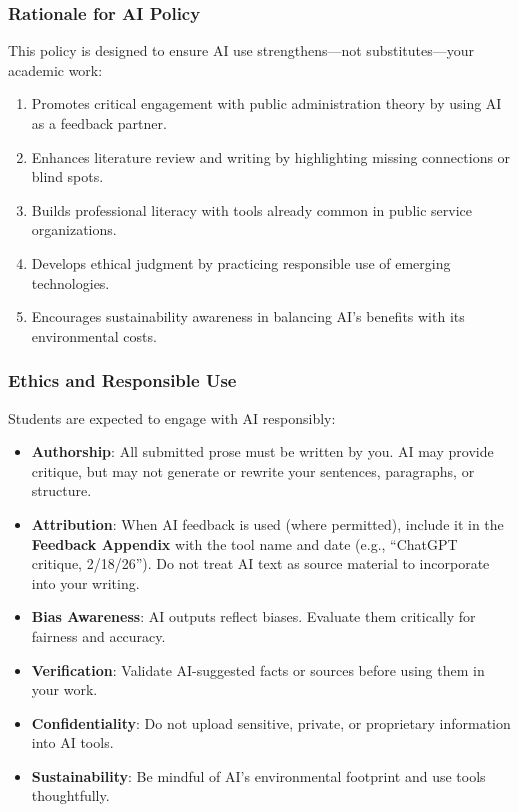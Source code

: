 \documentclass[11pt]{article}     %
\begin{document}
\subsubsection*{Rationale for AI Policy}

This policy is designed to ensure AI use strengthens---not substitutes---your academic work:

\begin{enumerate}
    \item Promotes critical engagement with public administration theory by using AI as a feedback partner.
    \item Enhances literature review and writing by highlighting missing connections or blind spots.
    \item Builds professional literacy with tools already common in public service organizations.
    \item Develops ethical judgment by practicing responsible use of emerging technologies.
    \item Encourages sustainability awareness in balancing AI's benefits with its environmental costs.
\end{enumerate}

\subsubsection*{Ethics and Responsible Use}

\noindent Students are expected to engage with AI responsibly:

\begin{itemize}
    \item \textbf{Authorship}: All submitted prose must be written by you. AI may provide critique, but may not generate or rewrite your sentences, paragraphs, or structure.
    \item \textbf{Attribution}: When AI feedback is used (where permitted), include it in the \textbf{Feedback Appendix} with the tool name and date (e.g., ``ChatGPT critique, 2/18/26''). Do not treat AI text as source material to incorporate into your writing.
    \item \textbf{Bias Awareness}: AI outputs reflect biases. Evaluate them critically for fairness and accuracy.
    \item \textbf{Verification}: Validate AI-suggested facts or sources before using them in your work.
    \item \textbf{Confidentiality}: Do not upload sensitive, private, or proprietary information into AI tools.
    \item \textbf{Sustainability}: Be mindful of AI's environmental footprint and use tools thoughtfully.
\end{itemize}
\end{document}
